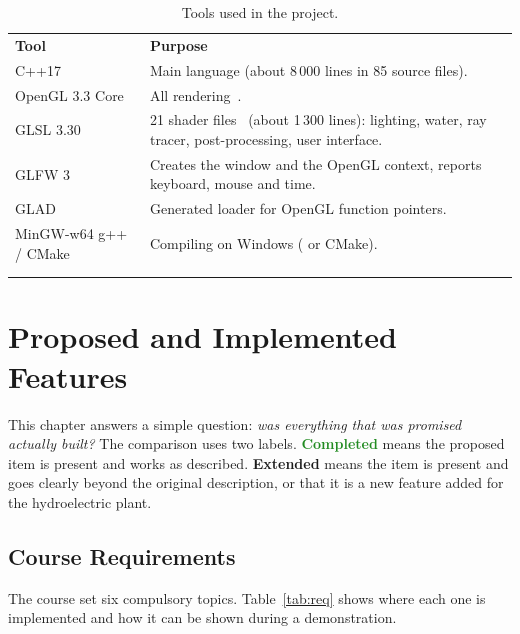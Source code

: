 \documentclass[11pt,a4paper]{report}
\newcommand{\thickhline}{\noalign{\global\setlength{\arrayrulewidth}{0.9pt}}\hline
                         \noalign{\global\setlength{\arrayrulewidth}{0.4pt}}}
\newcommand{\toprule}{\thickhline\noalign{\vskip 2pt}}
\newcommand{\midrule}{\noalign{\vskip 1pt}\hline\noalign{\vskip 2pt}}
\newcommand{\bottomrule}{\noalign{\vskip 1pt}\thickhline}
\newcommand{\code}[1]{\texttt{\detokenize{#1}}}
\newcommand{\done}{\textcolor{ForestGreen}{\textbf{Completed}}}
\newcommand{\ext}{\textcolor{accent}{\textbf{Extended}}}
\begin{document}
\begin{table}[!htbp]
\centering
\caption{Tools used in the project.}
\label{tab:tools}
\begin{tabularx}{\textwidth}{@{}L{3.6cm}Y@{}}
\toprule
\textbf{Tool} & \textbf{Purpose} \\
\midrule
C++17 & Main language (about 8\,000 lines in 85 source files). \\
OpenGL 3.3 Core & All rendering~\cite{glspec}. \\
GLSL 3.30 & 21 shader files~\cite{glslspec} (about 1\,300 lines): lighting, water, ray tracer,
            post-processing, user interface. \\
GLFW 3 & Creates the window and the OpenGL context, reports keyboard, mouse and time. \\
GLAD & Generated loader for OpenGL function pointers. \\
MinGW-w64 g++ / CMake & Compiling on Windows (\code{build.bat} or CMake). \\
\midrule
{} \\
\bottomrule
\end{tabularx}
\end{table}

\chapter{Proposed and Implemented Features}
\label{ch:compare}

This chapter answers a simple question: \emph{was everything that was promised
actually built?} The comparison uses two labels. \done{} means the proposed item is
present and works as described. \ext{} means the item is present and goes clearly
beyond the original description, or that it is a new feature added for the
hydroelectric plant.

\section{Course Requirements}

The course set six compulsory topics. Table~\ref{tab:req} shows where each one is
implemented and how it can be shown during a demonstration.
\end{document}
